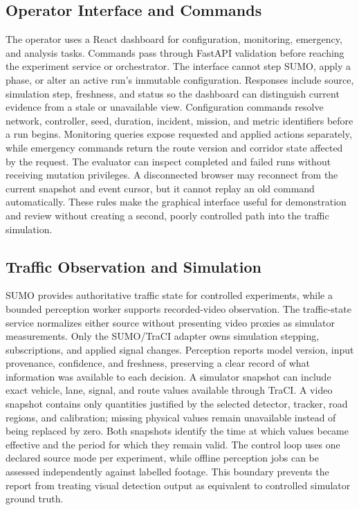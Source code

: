 \subsection{Operator Interface and Commands}

The operator uses a React dashboard for configuration, monitoring, emergency, and analysis tasks. Commands pass through FastAPI validation before reaching the experiment service or orchestrator. The interface cannot step SUMO, apply a phase, or alter an active run's immutable configuration. Responses include source, simulation step, freshness, and status so the dashboard can distinguish current evidence from a stale or unavailable view. Configuration commands resolve network, controller, seed, duration, incident, mission, and metric identifiers before a run begins. Monitoring queries expose requested and applied actions separately, while emergency commands return the route version and corridor state affected by the request. The evaluator can inspect completed and failed runs without receiving mutation privileges. A disconnected browser may reconnect from the current snapshot and event cursor, but it cannot replay an old command automatically. These rules make the graphical interface useful for demonstration and review without creating a second, poorly controlled path into the traffic simulation.

\subsection{Traffic Observation and Simulation}

SUMO provides authoritative traffic state for controlled experiments, while a bounded perception worker supports recorded-video observation. The traffic-state service normalizes either source without presenting video proxies as simulator measurements. Only the SUMO/TraCI adapter owns simulation stepping, subscriptions, and applied signal changes. Perception reports model version, input provenance, confidence, and freshness, preserving a clear record of what information was available to each decision. A simulator snapshot can include exact vehicle, lane, signal, and route values available through TraCI. A video snapshot contains only quantities justified by the selected detector, tracker, road regions, and calibration; missing physical values remain unavailable instead of being replaced by zero. Both snapshots identify the time at which values became effective and the period for which they remain valid. The control loop uses one declared source mode per experiment, while offline perception jobs can be assessed independently against labelled footage. This boundary prevents the report from treating visual detection output as equivalent to controlled simulator ground truth.

